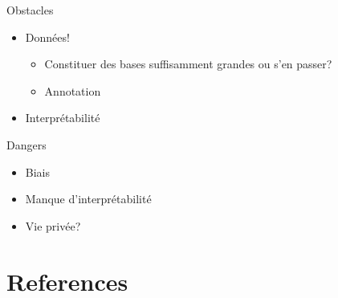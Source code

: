\documentclass[xcolor=pdftex,dvipsnames,table,mathserif]{beamer}
\begin{document}
\begin{frame}{Obstacles}

\begin{itemize}[<+->]
\item Données!
  \begin{itemize}
  \item Constituer des bases suffisamment grandes ou s'en passer?
  \item Annotation
  \end{itemize}
  \item Interprétabilité
\end{itemize}

\end{frame}


\begin{frame}{Dangers}

  \begin{itemize}[<+->]
  \item Biais
  \item Manque d'interprétabilité
  \item Vie privée?
  \end{itemize}

\end{frame}




\section*{References}



\end{document}
